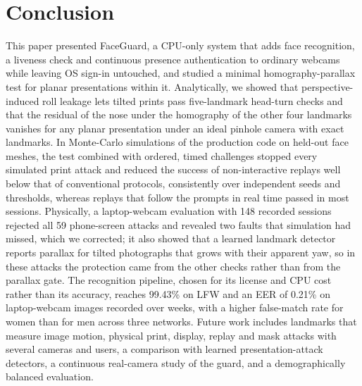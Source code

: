 \documentclass{ieeeaccess}
\begin{document}
\section{Conclusion}\label{sec:conclusion}
This paper presented FaceGuard, a CPU-only system that adds face recognition, a liveness check and continuous presence authentication to ordinary webcams while leaving OS sign-in untouched, and studied a minimal homography-parallax test for planar presentations within it. Analytically, we showed that perspective-induced roll leakage lets tilted prints pass five-landmark head-turn checks and that the residual of the nose under the homography of the other four landmarks vanishes for any planar presentation under an ideal pinhole camera with exact landmarks. In Monte-Carlo simulations of the production code on held-out face meshes, the test combined with ordered, timed challenges stopped every simulated print attack and reduced the success of non-interactive replays well below that of conventional protocols, consistently over independent seeds and thresholds, whereas replays that follow the prompts in real time passed in most sessions. Physically, a laptop-webcam evaluation with 148 recorded sessions rejected all 59 phone-screen attacks and revealed two faults that simulation had missed, which we corrected; it also showed that a learned landmark detector reports parallax for tilted photographs that grows with their apparent yaw, so in these attacks the protection came from the other checks rather than from the parallax gate. The recognition pipeline, chosen for its license and CPU cost rather than its accuracy, reaches 99.43\% on LFW and an EER of 0.21\% on laptop-webcam images recorded over weeks, with a higher false-match rate for women than for men across three networks. Future work includes landmarks that measure image motion, physical print, display, replay and mask attacks with several cameras and users, a comparison with learned presentation-attack detectors, a continuous real-camera study of the guard, and a demographically balanced evaluation.
\end{document}
